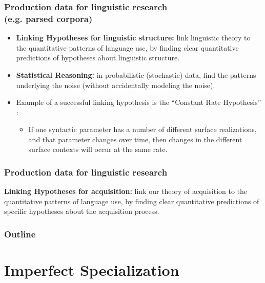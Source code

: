 \documentclass[hyperref={pdfpagelabels=false}]{beamer}
\begin{document}
\begin{frame}
\frametitle{Production data for linguistic research\\(e.g. parsed corpora)}
\begin{itemize}
	\item \textbf{Linking Hypotheses for linguistic structure:} link linguistic theory to the quantitative patterns of language use, by finding clear quantitative predictions of hypotheses about linguistic structure.
	\item \textbf{Statistical Reasoning:} in probabilistic (stochastic) data, find the patterns underlying the noise (without accidentally modeling the noise).
	\item Example of a successful linking hypothesis is the ``Constant Rate Hypothesis'' \citep[][and many subsequent]{kroch1989}:
		\begin{itemize}
			\item If one syntactic parameter has a number of different surface realizations, and that parameter changes over time, then changes in the different surface contexts will occur at the same rate.
		\end{itemize}

\end{itemize}
\end{frame}

\begin{frame}
\frametitle{Production data for linguistic research}
\begin{center}
	\textbf{Linking Hypotheses for acquisition:} link our theory of acquisition to the quantitative patterns of language use, by finding clear quantitative predictions of specific hypotheses about the acquisition process.
\end{center}
\end{frame}



\begin{frame}
\frametitle{Outline}
\tableofcontents
\end{frame}

\section{Imperfect Specialization}
\end{document}

